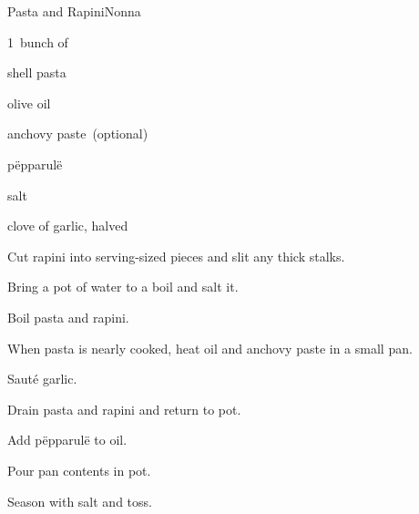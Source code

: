 \begin{recipe}{Pasta and Rapini}{Nonna}{}

\begin{ingredients}
\item 1~bunch of 
\item {} shell pasta
\item olive oil
\item anchovy paste~(optional)
\item p\"epparul\"e
\item salt
\item clove of garlic, halved
\end{ingredients}

\begin{directions}
\item Cut rapini into serving-sized pieces and slit any thick stalks.
\item Bring a pot of water to a boil and salt it.
\item Boil pasta and rapini.
\item When pasta is nearly cooked, heat oil and anchovy paste in a small pan.
\item Saut\'e garlic.
\item Drain pasta and rapini and return to pot.
\item Add p\"epparul\"e to oil.
\item Pour pan contents in pot.
\item Season with salt and toss.
\end{directions}

\end{recipe}
